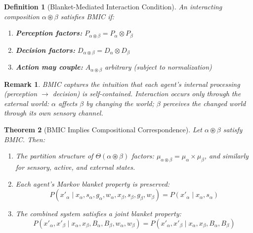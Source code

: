 \documentclass[11pt,a4paper]{article}
\newtheorem{theorem}{Theorem}[section]
\newtheorem{definition}[theorem]{Definition}
\newtheorem*{remark}{Remark}
\begin{document}
\begin{definition}[Blanket-Mediated Interaction Condition]\label{def:bmic}
An interacting composition $\alpha \circledast \beta$ satisfies \emph{BMIC} if:
\begin{enumerate}[nosep]
    \item[\textbf{(BMIC-1)}] \textbf{Perception factors:} $P_{\alpha \circledast \beta} = P_\alpha \otimes P_\beta$
    \item[\textbf{(BMIC-2)}] \textbf{Decision factors:} $D_{\alpha \circledast \beta} = D_\alpha \otimes D_\beta$
    \item[\textbf{(BMIC-3)}] \textbf{Action may couple:} $A_{\alpha \circledast \beta}$ arbitrary (subject to normalization)
\end{enumerate}
\end{definition}

\begin{remark}
BMIC captures the intuition that each agent's internal processing (perception $\to$ decision) is self-contained. Interaction occurs only through the external world: $\alpha$ affects $\beta$ by changing the world; $\beta$ perceives the changed world through its own sensory channel.
\end{remark}

\begin{theorem}[BMIC Implies Compositional Correspondence]\label{thm:bmic-suff}
Let $\alpha \circledast \beta$ satisfy BMIC. Then:
\begin{enumerate}[nosep]
    \item[(i)] The partition structure of $\Theta(\alpha \circledast \beta)$ factors: $\mu_{\alpha \circledast \beta} = \mu_\alpha \times \mu_\beta$, and similarly for sensory, active, and external states.
    \item[(ii)] Each agent's Markov blanket property is preserved:
    \[
    P(x'_\alpha \mid x_\alpha, s_\alpha, g_\alpha, w_\alpha, x_\beta, s_\beta, g_\beta, w_\beta) = P(x'_\alpha \mid x_\alpha, s_\alpha)
    \]
    \item[(iii)] The combined system satisfies a joint blanket property:
    \[
    P(x'_\alpha, x'_\beta \mid x_\alpha, x_\beta, B_\alpha, B_\beta, w_\alpha, w_\beta) = P(x'_\alpha, x'_\beta \mid x_\alpha, x_\beta, B_\alpha, B_\beta)
    \]
\end{enumerate}
\end{theorem}
\end{document}
